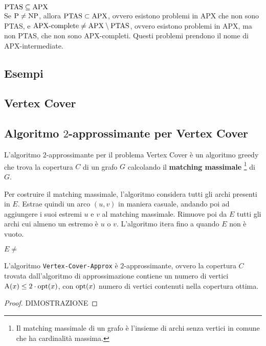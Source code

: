 \begin{rem}
    $\textnormal{PTAS} \subseteq \textnormal{APX}$\\
    Se $\textnormal{P} \neq \textnormal{NP}$, allora $\textnormal{PTAS} \subset \textnormal{APX}$, ovvero esistono problemi in APX che non sono PTAS, e $\textnormal{APX-complete} \neq \textnormal{APX} \setminus \textnormal{PTAS}$, ovvero esistono problemi in APX, ma non PTAS, che non sono APX-completi. Questi problemi prendono il nome di APX-intermediate.
\end{rem}

\subsection{Esempi}
\subsection*{Vertex Cover}
\subsection{Algoritmo $2$-approssimante per Vertex Cover}
L'algoritmo $2$-approssimante per il problema Vertex Cover è un algoritmo greedy che trova la copertura $C$ di un grafo $G$ calcolando il \textbf{matching massimale} \footnote{Il matching massimale di un grafo è l'insieme di archi senza vertici in comune che ha cardinalità massima.} di $G$. 

Per costruire il matching massimale, l'algoritmo considera tutti gli archi presenti in $E$. Estrae quindi un arco $(u,v)$ in maniera casuale, andando poi ad aggiungere i suoi estremi $u$ e $v$ al matching massimale. Rimuove poi da $E$ tutti gli archi cui almeno un estremo è $u$ o $v$. L'algoritmo itera fino a quando $E$ non è vuoto.

\begin{codebox}
    \li \While $E \neq $
    \End
\end{codebox}

\begin{thm}
    L'algoritmo \verb|Vertex-Cover-Approx| è $2$-approssimante, ovvero la copertura $C$ trovata dall'algoritmo di approssimazione contiene un numero di vertici $\textnormal{A}(x) \le 2 \cdot \textnormal{opt}(x)$, con $\textnormal{opt}(x)$ numero di vertici contenuti nella copertura ottima.
\end{thm}

\begin{proof}
    DIMOSTRAZIONE
\end{proof}

